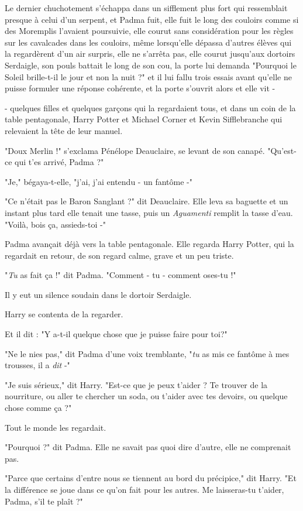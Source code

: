Le dernier chuchotement s'échappa dans un sifflement plus fort qui ressemblait presque à celui d'un serpent, et Padma fuit, elle fuit le long des couloirs comme si des Moremplis l'avaient poursuivie, elle courut sans considération pour les règles sur les cavalcades dans les couloirs, même lorsqu'elle dépassa d'autres élèves qui la regardèrent d'un air surpris, elle ne s'arrêta pas, elle courut jusqu'aux dortoirs Serdaigle, son pouls battait le long de son cou, la porte lui demanda "Pourquoi le Soleil brille-t-il le jour et non la nuit ?" et il lui fallu trois essais avant qu'elle ne puisse formuler une réponse cohérente, et la porte s'ouvrit alors et elle vit -

- quelques filles et quelques garçons qui la regardaient tous, et dans un coin de la table pentagonale, Harry Potter et Michael Corner et Kevin Sifflebranche qui relevaient la tête de leur manuel.

"Doux Merlin !" s'exclama Pénélope Deauclaire, se levant de son canapé. "Qu'est-ce qui t'es arrivé, Padma ?"

"Je," bégaya-t-elle, "j'ai, j'ai entendu - un fantôme -"

"Ce n'était pas le Baron Sanglant ?" dit Deauclaire. Elle leva sa baguette et un instant plus tard elle tenait une tasse, puis un \emph{Aguamenti}  remplit la tasse d'eau. "Voilà, bois ça, assieds-toi -"

Padma avançait déjà vers la table pentagonale. Elle regarda Harry Potter, qui la regardait en retour, de son regard calme, grave et un peu triste.

"\emph{Tu}  as fait ça !" dit Padma. "Comment - tu - comment oses-tu !"

Il y eut un silence soudain dans le dortoir Serdaigle.

Harry se contenta de la regarder.

Et il dit : "Y a-t-il quelque chose que je puisse faire pour toi?"

"Ne le nies pas," dit Padma d'une voix tremblante, "\emph{tu}  as mis ce fantôme à mes trousses, il a \emph{dit}  -"

"Je suis sérieux," dit Harry. "Est-ce que je peux t'aider ? Te trouver de la nourriture, ou aller te chercher un soda, ou t'aider avec tes devoirs, ou quelque chose comme ça ?"

Tout le monde les regardait.

"Pourquoi ?" dit Padma. Elle ne savait pas quoi dire d'autre, elle ne comprenait pas.

"Parce que certains d'entre nous se tiennent au bord du précipice," dit Harry. "Et la différence se joue dans ce qu'on fait pour les autres. Me laisseras-tu t'aider, Padma, s'il te plaît ?"

